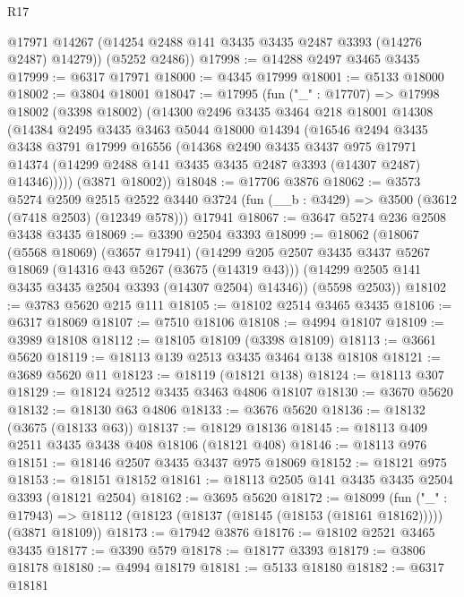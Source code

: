 \begin{lexlean}{R17}
\begin{coremodule}
        @17971
        @14267
        (@14254 @2488 @141 @3435 @3435 @2487 @3393 (@14276 @2487) @14279))
      (@5252 @2486))
@17998 := @14288 @2497 @3465 @3435
@17999 := @6317 @17971
@18000 := @4345 @17999
@18001 := @5133 @18000
@18002 := @3804 @18001
@18047 := @17995
    (fun ("_" : @17707) =>
    @17998
      @18002
      (@3398 @18002)
      (@14300
        @2496
        @3435
        @3464
        @218
        @18001
        @14308
        (@14384
          @2495
          @3435
          @3463
          @5044
          @18000
          @14394
          (@16546
            @2494
            @3435
            @3438
            @3791
            @17999
            @16556
            (@14368
              @2490
              @3435
              @3437
              @975
              @17971
              @14374
              (@14299 @2488 @141 @3435 @3435 @2487 @3393 (@14307 @2487) @14346)))))
      (@3871 @18002))
@18048 := @17706 @3876
@18062 := @3573
    @5274
    @2509
    @2515
    @2522
    @3440
    @3724
    (fun (__b : @3429) => @3500 (@3612 (@7418 @2503) (@12349 @578)))
    @17941
@18067 := @3647 @5274 @236 @2508 @3438 @3435
@18069 := @3390 @2504 @3393
@18099 := @18062
    (@18067
      (@5568 @18069)
      (@3657 @17941)
      (@14299
        @205
        @2507
        @3435
        @3437
        @5267
        @18069
        (@14316 @43 @5267 (@3675 (@14319 @43)))
        (@14299 @2505 @141 @3435 @3435 @2504 @3393 (@14307 @2504) @14346))
      (@5598 @2503))
@18102 := @3783 @5620 @215 @111
@18105 := @18102 @2514 @3465 @3435
@18106 := @6317 @18069
@18107 := @7510 @18106
@18108 := @4994 @18107
@18109 := @3989 @18108
@18112 := @18105 @18109 (@3398 @18109)
@18113 := @3661 @5620
@18119 := @18113 @139 @2513 @3435 @3464 @138 @18108
@18121 := @3689 @5620 @11
@18123 := @18119 (@18121 @138)
@18124 := @18113 @307
@18129 := @18124 @2512 @3435 @3463 @4806 @18107
@18130 := @3670 @5620
@18132 := @18130 @63 @4806
@18133 := @3676 @5620
@18136 := @18132 (@3675 (@18133 @63))
@18137 := @18129 @18136
@18145 := @18113 @409 @2511 @3435 @3438 @408 @18106 (@18121 @408)
@18146 := @18113 @976
@18151 := @18146 @2507 @3435 @3437 @975 @18069
@18152 := @18121 @975
@18153 := @18151 @18152
@18161 := @18113 @2505 @141 @3435 @3435 @2504 @3393 (@18121 @2504)
@18162 := @3695 @5620
@18172 := @18099
    (fun ("_" : @17943) =>
    @18112 (@18123 (@18137 (@18145 (@18153 (@18161 @18162))))) (@3871 @18109))
@18173 := @17942 @3876
@18176 := @18102 @2521 @3465 @3435
@18177 := @3390 @579
@18178 := @18177 @3393
@18179 := @3806 @18178
@18180 := @4994 @18179
@18181 := @5133 @18180
@18182 := @6317 @18181

\end{coremodule}
\end{lexlean}
